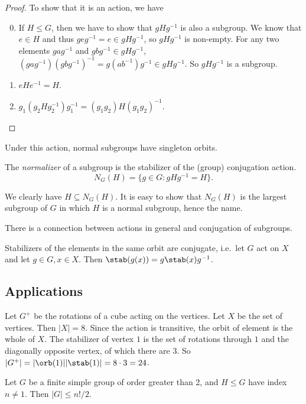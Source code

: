 \documentclass[a4paper]{article}
\begin{document}
\begin{proof}
  To show that it is an action, we have
  \begin{enumerate}[label=\arabic{*}.]
      \setcounter{enumi}{-1}
    \item If $H\leq G$, then we have to show that $gHg^{-1}$ is also a subgroup. We know that $e\in H$ and thus $geg^{-1} = e\in gHg^{-1}$, so $gHg^{-1}$ is non-empty. For any two elements $gag^{-1}$ and $gbg^{-1}\in gHg^{-1}$, $(gag^{-1})(gbg^{-1})^{-1} = g(ab^{-1})g^{-1}\in gHg^{-1}$. So $gHg^{-1}$ is a subgroup.
    \item $eHe^{-1} = H$.
    \item $g_1(g_2Hg_2^{-1})g_1^{-1} = (g_1g_2)H(g_1g_2)^{-1}$.
  \end{enumerate}
\end{proof}
Under this action, normal subgroups have singleton orbits.

\begin{defi}
  The \emph{normalizer} of a subgroup is the stabilizer of the (group) conjugation action.
  \[
    N_G(H) = \{g\in G: gHg^{-1} = H\}.
  \]
\end{defi}
We clearly have $H\subseteq N_G(H)$. It is easy to show that $N_G(H)$ is the largest subgroup of $G$ in which $H$ is a normal subgroup, hence the name.

There is a connection between actions in general and conjugation of subgroups.

\begin{lemma}
  Stabilizers of the elements in the same orbit are conjugate, i.e.\ let $G$ act on $X$ and let $g\in G, x\in X$. Then $\stab(g(x)) = g\stab(x)g^{-1}$.
\end{lemma}

\subsection{Applications}
\begin{eg}
  Let $G^{+}$ be the rotations of a cube acting on the vertices. Let $X$ be the set of vertices. Then $|X| = 8$. Since the action is transitive, the orbit of element is the whole of $X$. The stabilizer of vertex $1$ is the set of rotations through $1$ and the diagonally opposite vertex, of which there are 3. So $|G^{+}| = |\orb(1)||\stab(1)| = 8\cdot 3 = 24$.
\end{eg}

\begin{eg}
  Let $G$ be a finite simple group of order greater than 2, and $H\leq G$ have index $n\not= 1$. Then $|G| \leq n!/2$.
\end{eg}
\end{document}

